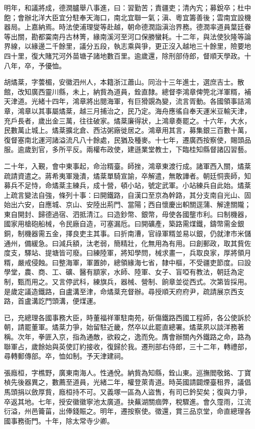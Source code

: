 \begin{pinyinscope}
明年，和議將成，德潤臚舉八事進，曰：習勤苦；責疆吏；清內宄；募銳卒；杜中飽；會辦北洋大臣宜分駐奉天海口，南北宜聯一氣；滇、粵宜籌善後；雲南宜設機器局。上嘉納焉。時法使浦理燮等赴越，朝命德潤詣滇治界務。德潤率道員葉廷眷等出關，勘都霙南丹古林箐，緣南溪河至河口保勝蠻耗。十二年，與法使狄隆等論界線，以緣邊二千餘里，議分五段，執志乘與爭，更正沒入越地三十餘里，險要地四十里，復大賭咒河外苗塘子諸地數百里。逾歲還，除刑部侍郎，督順天學政。十八年，卒，予優恤。

胡燏棻，字蕓楣，安徽泗州人，本籍浙江蕭山。同治十三年進士，選庶吉士。散館，改知廣西靈川縣，未上，納貲為道員，銓直隸。總督李鴻章俾筦北洋軍糈，補天津道。光緒十四年，鴻章將出閱海軍，有巨猾覬為變，流言胥動。各國領事詰鴻章，鴻章以其事屬燏棻，越三月捕治之，民乃定。海舟應徭自奉天運米豆輸天津，充戶長者，歲出金三萬，往往破家。燏棻廉得狀，上鴻章奏罷之。十六年，大水，民數萬止城上。燏棻擴北倉、西沽粥廠徙居之。鴻章用其言，募集銀三百數十萬，復督塞南北運河諸溢流凡八十餘處，民猶及種麥。十七年，遷廣西按察使，賜頭品服。逾歲到官，多所平反。兩權布政使，建遜業堂教士，下臨桂知縣督諸囚習藝。

二十年，入覲，會中東事起，命治糈臺。師挫，鴻章東渡行成。諸軍西入關，燏棻疏請資遣之。蔣希夷軍幾潰，燏棻單騎宣諭，卒解遣，無敢譁者。朝廷恫喪師，知募兵不足恃，命燏棻主練兵，成十營，頓小站，號定武軍。小站練兵自此始。燏棻上疏言變法自強，條列十事：曰開鐵路，自漢口至京為幹路，其分支南自光山、固始出六安，自應城、京山、安陸出荊門、當陽；西自懷慶出軹關逕蒲、解達關隴；東自開封、歸德過宿、泗抵清江。曰造鈔幣、銀幣，毋使各國壟市利。曰制機器，國家用槍砲船械，令民廠自造，可塞漏卮。曰開礦產，築路需煤鐵，鑄幣需金銀銅，制機器需五金，擇良吏主其事。曰折南漕，官祿軍糈並易以銀，仍就津市米儲通州，備緩急。曰減兵額，汰老弱，簡精壯，化無用為有用。曰創郵政，取其貲佐度支，驛站、提塘皆可廢。曰練陸軍，將知學問，械求畫一，兵取良家，厚將領月糈，嚴戒侵蝕。曰整海軍，軍置帥，總領緣海七省，隸中樞，不受疆吏節度。曰設學堂，農、商、工、礦、醫有顓家，水師、陸軍、女子、盲啞有教法，朝廷為定制，甄而用之。又言停武科，練旗兵，器械、營制、餉章並從西式。次第皆採用。是歲定議造鐵路，自盧溝至津，命燏棻充督辦。尋授順天府府尹，疏請展京西支路，首盧溝訖門頭溝，便煤運。

已，充總理各國事務大臣，時董福祥軍駐南苑，斫傷鐵路西國工程師，各公使訴於朝，請罷董軍。燏棻力爭，始留駐近畿，然卒以此罷直總署。燏棻夙以談洋務著稱。次年，拳匪入京，指為通敵，欲殺之，逸而免。膺會辦關內外鐵路之命，路為聯軍占，歲餘始與英使訂約接收，復歸於我。遷刑部右侍郎，三十二年，轉禮部，尋轉郵傳部。卒，恤如制。予天津建祠。

張廕桓，字樵野，廣東南海人。性通侻。納貲為知縣，銓山東。巡撫閻敬銘、丁寶楨先後器異之，數薦至道員，光緒二年，權登萊青道。時英國請闢煙臺租界，議倡馬頭捐以斂厚貲，廕桓持不可。又義塚一區為人盜售，有司已鈐契矣；復與力爭，卒返其地。七年，授安徽徽寧池太廣道。抉蕪湖關痼弊，稅驟進。會久霪雨，江流衍溢，州邑籥菑，出俸錢賑之。明年，遷按察使。徵還，賞三品京堂，命直總理各國事務衙門。十年，除太常寺少卿。


\end{pinyinscope}

